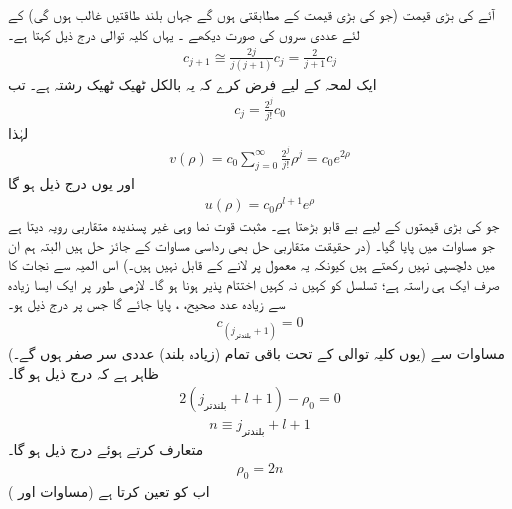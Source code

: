  آئے  کی بڑی قیمت (جو   کی بڑی قیمت کے مطابقتی ہوں گے جہاں بلند طاقتیں غالب ہوں گی) کے لئے عددی سروں کی صورت دیکھے ۔ یہاں  کلیہ توالی درج ذیل کہتا ہے۔
\begin{align*}
c_{j+1}\cong\frac{2j}{j(j+1)}c_{j}=\frac{2}{j+1}c_{j} 
\end{align*}
ایک لمحہ کے لیے فرض کرے کہ یہ بالکل ٹھیک ٹھیک رشتہ ہے۔ تب 
\begin{align}
c_{j}=\frac{2^{j}}{j!}c_{0} 
\end{align}
لہٰذا
\begin{align*}
v(\rho)=c_{0}\sum_{j=0}^{\infty}\frac{2^{j}}{j!}\rho^{j}=c_{0}e^{2\rho} 
\end{align*}
 اور یوں  درج ذیل ہو گا
\begin{align}
u(\rho)=c_{0}\rho^{l+1}e^{\rho} 
\end{align}
 جو     کی بڑی قیمتوں کے لیے  بے قابو بڑھتا ہے۔ مثبت قوت نما وہی غیر پسندیدہ متقاربی رویہ دیتا ہے جو مساوات  میں پایا گیا۔ (در حقیقت  متقاربی حل بھی رداسی مساوات کے جائز حل ہیں البتہ ہم ان میں دلچسپی نہیں رکھتے ہیں کیونکہ یہ معمول پر  لانے کے قابل نہیں ہیں۔) اس المیہ سے نجات کا صرف ایک ہی راستہ ہے؛ تسلسل کو کہیں نہ کہیں اختتام پذیر ہونا ہو گا۔ لازمی طور پر ایک ایسا زیادہ سے زیادہ عدد صحیح، ، پایا جائے گا جس پر درج ذیل ہو۔
 \begin{align}
c_{(j_{\text{بلندتر}}+1)}=0
\end{align}
 (یوں کلیہ توالی کے تحت باقی تمام (زیادہ بلند) عددی سر صفر ہوں گے۔)  مساوات  سے ظاہر ہے کہ درج ذیل ہو گا۔
 \begin{align*}
2(j_{\text{بلندتر}}+l+1)-\rho_{0}=0 
\end{align*}
 \begin{align}\label{مساوات_ابعادی_صدر_کوانٹائی_عدد}
n\equiv j_{\text{بلندتر}}+l+1 
\end{align}
 متعارف کرتے ہوئے درج ذیل ہو گا۔
 \begin{align}\label{مساوات_ابعادی_رو_این}
\rho_{0}=2n 
\end{align}
 اب  کو    تعین کرتا ہے (مساوات  اور )
